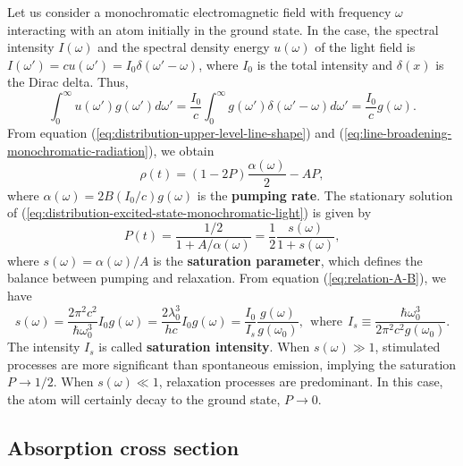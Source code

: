 Let us consider a monochromatic electromagnetic field with frequency $ \omega $ interacting with an atom initially in the ground state. In the case, the spectral intensity $ I(\omega) $ and the spectral density energy $ u(\omega) $ of the light field is $ I(\omega') = c u(\omega') = I_0 \delta(\omega' - \omega) $, where $ I_0 $ is the total intensity and $ \delta(x) $ is the Dirac delta. Thus,
\begin{equation}
	\int_{0}^{\infty} u(\omega') g(\omega') d\omega' = \frac{I_0}{c} \int_{0}^{\infty} g(\omega') \delta(\omega' - \omega) d\omega' = \frac{I_0}{c} g(\omega).
	\label{eq:line-broadening-monochromatic-radiation}
\end{equation}
From equation (\ref{eq:distribution-upper-level-line-shape}) and (\ref{eq:line-broadening-monochromatic-radiation}), we obtain
\begin{equation}
	\rho(t) = (1 - 2P) \frac{\alpha(\omega)}{2} - A P,
	\label{eq:distribution-excited-state-monochromatic-light}
\end{equation}
where $ \alpha(\omega) = 2B(I_0 / c)g(\omega) $ is the \textbf{pumping rate}. The stationary solution of (\ref{eq:distribution-excited-state-monochromatic-light}) is given by
\begin{equation}
	P(t) = \frac{1 / 2}{1 + A / \alpha(\omega)} = \frac{1}{2} \frac{s(\omega)}{1 + s(\omega)},
	\label{eq:probability-excited-state-monochromatic-light}
\end{equation}
where $ s(\omega) = \alpha(\omega) / A $ is the \textbf{saturation parameter}, which defines the balance between pumping and relaxation. From equation (\ref{eq:relation-A-B}), we have
\begin{equation}
	s(\omega) = \frac{2\pi^2 c^2}{\hbar \omega_0^3} I_0 g(\omega) = \frac{2\lambda_0^3}{h c} I_0 g(\omega) = \frac{I_0}{I_s} \frac{g(\omega)}{g(\omega_0)},\ \ \textrm{where}\ \ I_s \equiv \frac{\hbar \omega_0^3}{2\pi^2 c^2 g(\omega_0)} .
	\label{eq:saturation-parameter-ERE}
\end{equation}
The intensity $ I_s $ is called \textbf{saturation intensity}. When $ s(\omega) \gg 1 $, stimulated processes are more significant than spontaneous emission, implying the saturation $ P \longrightarrow 1/2 $. When $ s(\omega) \ll 1 $, relaxation processes are predominant. In this case, the atom will certainly decay to the ground state, $ P \longrightarrow 0 $.

%
\subsection{Absorption cross section}
\label{sec:absorption-cross-section}
%

